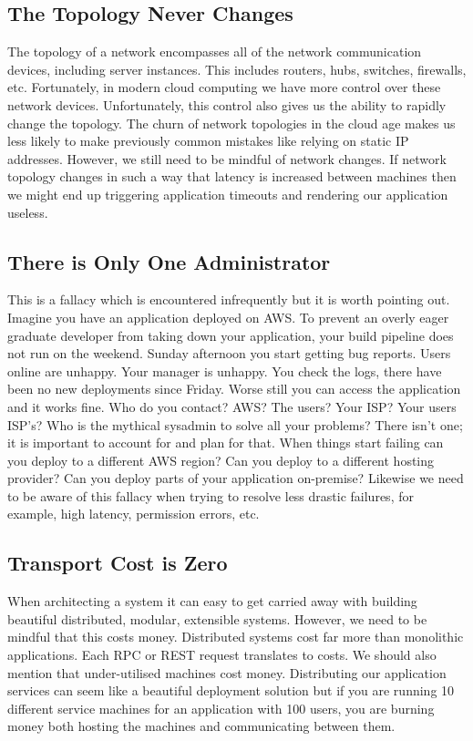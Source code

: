 \subsection{The Topology Never Changes}
The topology of a network encompasses all of the network communication devices, including server instances.
This includes routers, hubs, switches, firewalls, etc.
Fortunately, in modern cloud computing we have more control over these network devices.
Unfortunately, this control also gives us the ability to rapidly change the topology.
The churn of network topologies in the cloud age makes us less likely to make previously common mistakes like relying on static IP addresses.
However, we still need to be mindful of network changes.
If network topology changes in such a way that latency is increased between machines then we might end up triggering application timeouts and rendering our application useless.

\subsection{There is Only One Administrator}
This is a fallacy which is encountered infrequently but it is worth pointing out.
Imagine you have an application deployed on AWS.
To prevent an overly eager graduate developer from taking down your application,
your build pipeline does not run on the weekend.
Sunday afternoon you start getting bug reports.
Users online are unhappy.
Your manager is unhappy.
You check the logs,
there have been no new deployments since Friday.
Worse still you can access the application and it works fine.
Who do you contact?
AWS? The users? Your ISP? Your users ISP's?
Who is the mythical sysadmin to solve all your problems?
There isn't one; it is important to account for and plan for that.
When things start failing can you deploy to a different AWS region?
Can you deploy to a different hosting provider?
Can you deploy parts of your application on-premise?
Likewise we need to be aware of this fallacy when trying to resolve less drastic failures, for example, high latency, permission errors, etc.

\subsection{Transport Cost is Zero}
When architecting a system it can easy to get carried away with building beautiful distributed, modular, extensible systems.
However, we need to be mindful that this costs money.
Distributed systems cost far more than monolithic applications.
Each RPC or REST request translates to costs.
We should also mention that under-utilised machines cost money.
Distributing our application services can seem like a beautiful deployment solution but if you are running 10 different service machines for an application with 100 users,
you are burning money both hosting the machines and communicating between them. 

